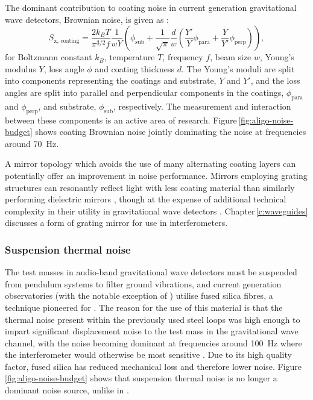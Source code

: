 The dominant contribution to coating noise in current generation gravitational wave detectors, Brownian noise, is given as \cite{Harry2002}:
\begin{equation}
  \label{eq:coating-brownian-psd}
  S_{\text{x, coating}} = \frac{2 k_B T}{\pi^{3/2} f} \frac{1}{w Y} \left( \phi_{\text{sub}} + \frac{1}{\sqrt{\pi}} \frac{d}{w} \left( \frac{Y'}{Y} \phi_{\text{para}} + \frac{Y}{Y'} \phi_{\text{perp}} \right) \right),
\end{equation}
for Boltzmann constant $k_B$, temperature $T$, frequency $f$, beam size $w$, Young's modulus $Y$, loss angle $\phi$ and coating thickness $d$. The Young's moduli are split into components representing the coatings and substrate, $Y$ and $Y'$, and the loss angles are split into parallel and perpendicular components in the coatings, $\phi_{\text{para}}$ and $\phi_{\text{perp}}$, and substrate, $\phi_{\text{sub}}$, respectively. The measurement and interaction between these components is an active area of research. Figure\,\ref{fig:aligo-noise-budget} shows coating Brownian noise jointly dominating the noise at frequencies around \SI{70}{\hertz}.

A mirror topology which avoids the use of many alternating coating layers can potentially offer an improvement in noise performance. Mirrors employing grating structures can resonantly reflect light with less coating material than similarly performing dielectric mirrors \cite{Mashev1985}, though at the expense of additional technical complexity in their utility in gravitational wave detectors \cite{Leavey2015}. Chapter\,\ref{c:waveguides} discusses a form of grating mirror for use in interferometers.

\subsubsection{\label{sec:sus-thermal-noise}Suspension thermal noise}
The test masses in audio-band gravitational wave detectors must be suspended from pendulum systems to filter ground vibrations, and current generation observatories (with the notable exception of \KAGRA{}) utilise fused silica fibres, a technique pioneered for \GEO{} \cite{Barr2002}. The reason for the use of this material is that the thermal noise present within the previously used steel loops was high enough to impart significant displacement noise to the test mass in the gravitational wave channel, with the noise becoming dominant at frequencies around \SI{100}{\hertz} where the interferometer would otherwise be most sensitive \cite{Hammond2012}. Due to its high quality factor, fused silica has reduced mechanical loss and therefore lower noise. Figure\,\ref{fig:aligo-noise-budget} shows that suspension thermal noise is no longer a dominant noise source, unlike in \ILIGO{}.

